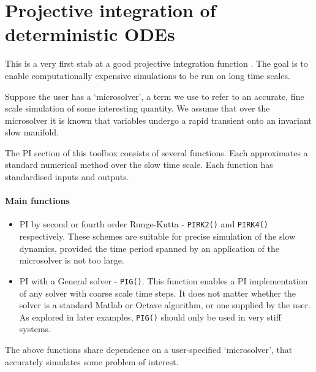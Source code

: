 \section{Projective integration of deterministic ODEs}
\label{sec:newPI}

This is a very first stab at a good projective integration function \cite[e.g.]{Gear02b, Gear03c, Givon06}. The goal is to enable computationally expensive simulations to be run on long time scales.

Suppose the user has a `microsolver', a term we use to refer to an accurate, fine scale simulation of some interesting quantity. We assume that over the microsolver it is known that variables undergo a rapid transient onto an invariant slow manifold. 

The PI section of this toolbox consists of several functions. Each approximates a standard numerical method over the slow time scale. Each function has standardised inputs and outputs.

\paragraph{Main functions}
\begin{itemize}
\item PI by second or fourth order Runge-Kutta - \verb|PIRK2()| and \verb|PIRK4()| respectively. These schemes are suitable for precise simulation of the slow dynamics, provided the time period spanned by an application of the microsolver is not too large.
\item PI with a General solver - \verb|PIG()|. This function enables a PI implementation of any solver with coarse scale time steps. It does not matter whether the solver is a standard Matlab or Octave algorithm, or one supplied by the user. As explored in later examples, \verb|PIG()| should only be used in very stiff systems. 
\end{itemize}
The above functions share dependence on a user-specified `microsolver', that accurately simulates some problem of interest. 
